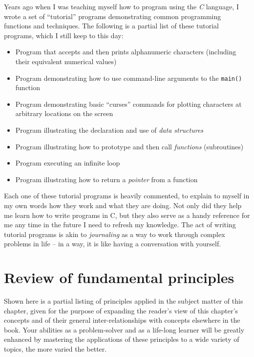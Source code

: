 
\vskip 10pt

\filbreak

Years ago when I was teaching myself how to program using the \textit{C} language, I wrote a set of ``tutorial'' programs demonstrating common programming functions and techniques.  The following is a partial list of these tutorial programs, which I still keep to this day:

\begin{itemize}
\item Program that accepts and then prints alphanumeric characters (including their equivalent numerical values)
\item Program demonstrating how to use command-line arguments to the \texttt{main()} function
\item Program demonstrating basic ``curses'' commands for plotting characters at arbitrary locations on the screen
\item Program illustrating the declaration and use of \textit{data structures}
\item Program illustrating how to prototype and then call \textit{functions} (subroutines)
\item Program executing an infinite loop 
\item Program illustrating how to return a \textit{pointer} from a function 
\end{itemize}

Each one of these tutorial programs is heavily commented, to explain to myself in my own words how they work and what they are doing.  Not only did they help me learn how to write programs in C, but they also serve as a handy reference for me any time in the future I need to refresh my knowledge.  The act of writing tutorial programs is akin to \textit{journaling} as a way to work through complex problems in life -- in a way, it is like having a conversation with yourself.








\filbreak
\section{Review of fundamental principles}

Shown here is a partial listing of principles applied in the subject matter of this chapter, given for the purpose of expanding the reader's view of this chapter's concepts and of their general inter-relationships with concepts elsewhere in the book.  Your abilities as a problem-solver and as a life-long learner will be greatly enhanced by mastering the applications of these principles to a wide variety of topics, the more varied the better.

